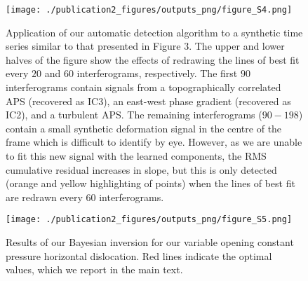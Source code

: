 \begin{figure}[]
	\centering 
 	\texttt{[image: ./publication2\_figures/outputs\_png/figure\_S4.png]}
	\caption[Automatic detection algorithm: Low magnitude signal]{Application of our automatic detection algorithm to a synthetic time series similar to that presented in Figure $3$.  The upper and lower halves of the figure show the effects of redrawing the lines of best fit every $20$ and $60$ interferograms, respectively. The first $90$ interferograms contain signals from a topographically correlated APS (recovered as IC3), an east-west phase gradient (recovered as IC2), and a turbulent APS.  The remaining interferograms ($90 - 198$) contain a small synthetic deformation signal in the centre of the frame which is difficult to identify by eye.  However, as we are unable to fit this new signal with the learned components, the RMS cumulative residual increases in slope, but this is only detected (orange and yellow highlighting of points) when the lines of best fit are redrawn every $60$ interferograms. }
	\label{fig:s3}
\end{figure}


\begin{figure}[]
	\centering 
 	\texttt{[image: ./publication2\_figures/outputs\_png/figure\_S5.png]}
	\caption[Bayesian inversion parameters]{Results of our Bayesian inversion for our variable opening constant pressure horizontal dislocation. Red lines indicate the optimal values, which we report in the main text. }
	\label{fig:s4}
\end{figure}

